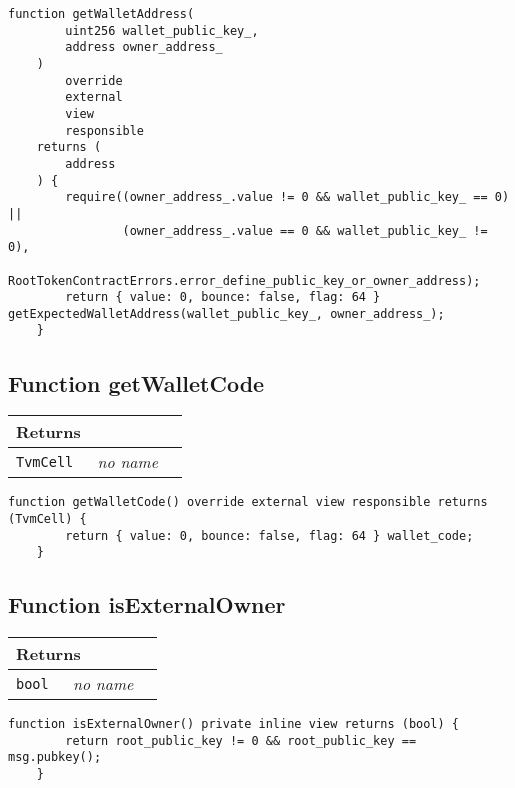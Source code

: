 \vspace{2cm}

\begin{lstlisting}[firstnumber=111]
    function getWalletAddress(
        uint256 wallet_public_key_,
        address owner_address_
    )
        override
        external
        view
        responsible
    returns (
        address
    ) {
        require((owner_address_.value != 0 && wallet_public_key_ == 0) ||
                (owner_address_.value == 0 && wallet_public_key_ != 0),
                RootTokenContractErrors.error_define_public_key_or_owner_address);
        return { value: 0, bounce: false, flag: 64 } getExpectedWalletAddress(wallet_public_key_, owner_address_);
    }
\end{lstlisting}

\subsection{Function getWalletCode}


\ifsoltables
\noindent\begin{tabular}{|l|l|p{5cm}|}\hline
\multicolumn{3}{|l|}{\bf Returns}\\\hline
\tt TvmCell & {\em no name} &\\\hline
\end{tabular}
\fi

\vspace{2cm}

\begin{lstlisting}[firstnumber=100]
    function getWalletCode() override external view responsible returns (TvmCell) {
        return { value: 0, bounce: false, flag: 64 } wallet_code;
    }
\end{lstlisting}

\subsection{Function isExternalOwner}


\ifsoltables
\noindent\begin{tabular}{|l|l|p{5cm}|}\hline
\multicolumn{3}{|l|}{\bf Returns}\\\hline
\tt bool & {\em no name} &\\\hline
\end{tabular}
\fi

\vspace{2cm}

\begin{lstlisting}[firstnumber=476]
    function isExternalOwner() private inline view returns (bool) {
        return root_public_key != 0 && root_public_key == msg.pubkey();
    }
\end{lstlisting}

